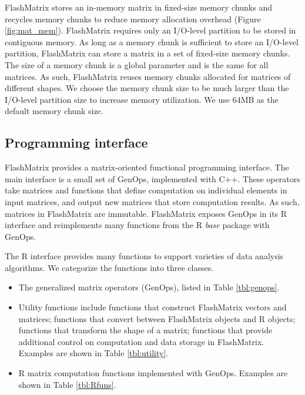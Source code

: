 FlashMatrix stores an in-memory matrix in fixed-size memory chunks and
recycles memory chunks to reduce memory allocation overhead (Figure
\ref{fig:mat_mem}). FlashMatrix requires only an I/O-level partition to
be stored in contiguous memory. As long as a memory chunk is sufficient
to store an I/O-level partition, FlashMatrix can store a matrix in a set
of fixed-size memory chunks. The size of a memory chunk is a global parameter
and is the same for all matrices. As such, FlashMatrix reuses memory chunks
allocated for matrices of different shapes. 
We choose the memory chunk
size to be much larger than the I/O-level partition size to increase
memory utilization. We use 64MB as the default memory chunk size.


\subsection{Programming interface}

FlashMatrix provides a matrix-oriented functional programming interface.
The main interface is a small set of GenOps, implemented with C++. These
operators take matrices and
functions that define computation on individual elements in input matrices,
and output new matrices that store computation results. As such, matrices in
FlashMatrix are immutable. FlashMatrix exposes
GenOps in its R interface and reimplements many functions from the R
\textit{base} package with GenOps.

The R interface provides many functions to support varieties of data analysis
algorithms. We categorize the functions into three classes.
\begin{itemize}
	\item The generalized matrix operators (GenOps), listed in Table
		\ref{tbl:genops}.
	\item Utility functions include functions that construct FlashMatrix vectors
		and matrices; functions that convert between FlashMatrix objects and R
		objects; functions that transform the shape of a matrix; functions that
		provide additional control on computation and data storage in FlashMatrix.
		Examples are shown in Table \ref{tbl:utility}.
	\item R matrix computation functions implemented with GenOps. Examples
		are shown in Table \ref{tbl:Rfuns}.
\end{itemize}

